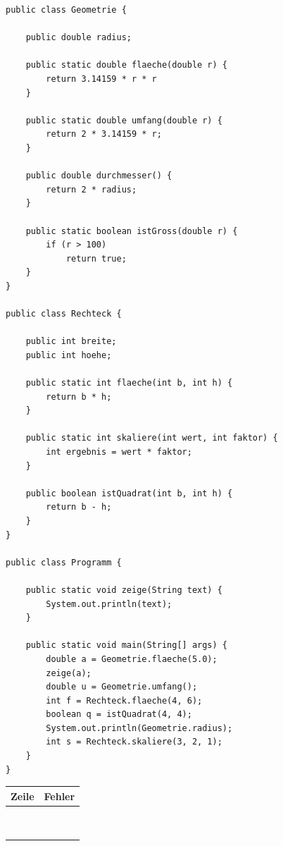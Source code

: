 \documentclass[
	fontsize=12pt,
	paper=a4,
	numbers=noenddot,
	parskip=half,
	openany
]{scrbook}
\begin{document}
\begin{lstlisting}
public class Geometrie {

    public double radius;

    public static double flaeche(double r) {
        return 3.14159 * r * r
    }

    public static double umfang(double r) {
        return 2 * 3.14159 * r;
    }

    public double durchmesser() {
        return 2 * radius;
    }

    public static boolean istGross(double r) {
        if (r > 100)
            return true;
    }
}

public class Rechteck {

    public int breite;
    public int hoehe;

    public static int flaeche(int b, int h) {
        return b * h;
    }

    public static int skaliere(int wert, int faktor) {
        int ergebnis = wert * faktor;
    }

    public boolean istQuadrat(int b, int h) {
        return b - h;
    }
}

public class Programm {

    public static void zeige(String text) {
        System.out.println(text);
    }

    public static void main(String[] args) {
        double a = Geometrie.flaeche(5.0);
        zeige(a);
        double u = Geometrie.umfang();
        int f = Rechteck.flaeche(4, 6);
        boolean q = istQuadrat(4, 4);
        System.out.println(Geometrie.radius);
        int s = Rechteck.skaliere(3, 2, 1);
    }
}
\end{lstlisting}

\begin{center}
\renewcommand{\arraystretch}{1.3}
\begin{tabular}{|p{1.6cm}|p{10.5cm}|}
	\hline
	\textbf{Zeile} & \textbf{Fehler} \\ \hline
	& \\[1.4cm] \hline
	& \\[1.4cm] \hline
	& \\[1.4cm] \hline
	& \\[1.4cm] \hline
	& \\[1.4cm] \hline
	& \\[1.4cm] \hline
	& \\[1.4cm] \hline
	& \\[1.4cm] \hline
	& \\[1.4cm] \hline
\end{tabular}
\end{center}
\end{document}
